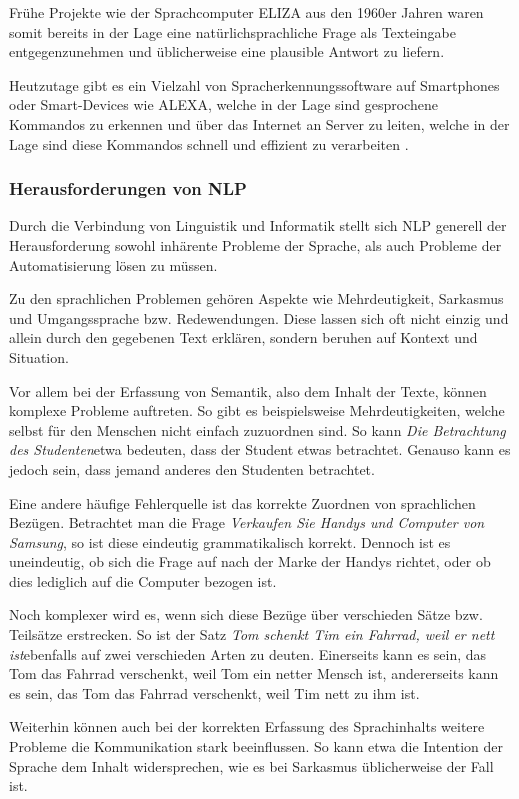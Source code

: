 \documentclass[12pt]{report}
\begin{document}
Frühe Projekte wie der Sprachcomputer ELIZA aus den 1960er Jahren waren somit bereits in der Lage eine natürlichsprachliche Frage als Texteingabe entgegenzunehmen und üblicherweise eine plausible Antwort zu liefern.   

Heutzutage gibt es ein Vielzahl von Spracherkennungssoftware auf Smartphones oder Smart-Devices wie ALEXA, welche in der Lage sind gesprochene Kommandos zu erkennen und über das Internet an Server zu leiten, welche in der Lage sind diese Kommandos schnell und effizient zu verarbeiten \cite{hao14}.

\subsubsection{Herausforderungen von NLP}
Durch die Verbindung von Linguistik und Informatik stellt sich NLP generell der Herausforderung sowohl inhärente Probleme der Sprache, als auch Probleme der Automatisierung lösen zu müssen. 

Zu den sprachlichen Problemen gehören Aspekte wie Mehrdeutigkeit, Sarkasmus und Umgangssprache bzw. Redewendungen. Diese lassen sich oft nicht einzig und allein durch den gegebenen Text erklären, sondern beruhen auf Kontext und Situation.

Vor allem bei der Erfassung von Semantik, also dem Inhalt der Texte, können komplexe Probleme auftreten. So gibt es beispielsweise Mehrdeutigkeiten, welche selbst für den Menschen nicht einfach zuzuordnen sind. So kann \glqq \textit{Die Betrachtung des Studenten}\grqq etwa bedeuten, dass der Student etwas betrachtet. Genauso kann es jedoch sein, dass jemand anderes den Studenten betrachtet. 

Eine andere häufige Fehlerquelle ist das korrekte Zuordnen von sprachlichen Bezügen. Betrachtet man die Frage \glqq \textit{Verkaufen Sie Handys und Computer von Samsung}\grqq, so ist diese eindeutig grammatikalisch korrekt. Dennoch ist es uneindeutig, ob sich die Frage auf nach der Marke der Handys richtet, oder ob dies lediglich auf die Computer bezogen ist. 

Noch komplexer wird es, wenn sich diese Bezüge über verschieden Sätze bzw. Teilsätze erstrecken. So ist der Satz \glqq \textit{Tom schenkt Tim ein Fahrrad, weil er nett ist}\grqq ebenfalls auf zwei verschieden Arten zu deuten. Einerseits kann es sein, das Tom das Fahrrad verschenkt, weil Tom ein netter Mensch ist, andererseits kann es sein, das Tom das Fahrrad verschenkt, weil Tim nett zu ihm ist. 

Weiterhin können auch bei der korrekten Erfassung des Sprachinhalts weitere Probleme die Kommunikation stark beeinflussen. So kann etwa die Intention der Sprache dem Inhalt widersprechen, wie es bei Sarkasmus üblicherweise der Fall ist. 
\end{document}
